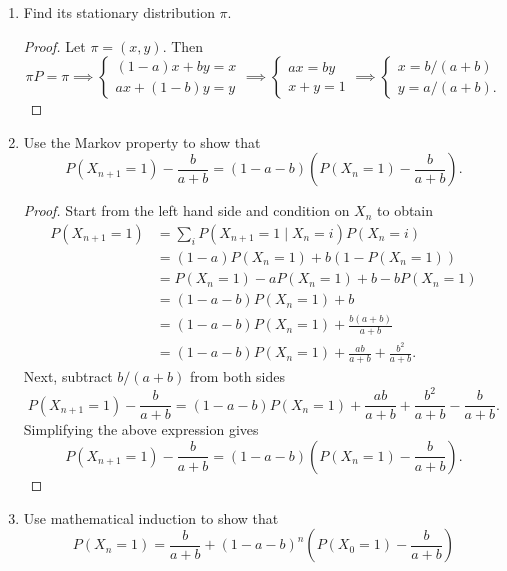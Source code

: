 \documentclass[oneside,reqno]{amsart}
\theoremstyle{definition}
\begin{document}
\begin{enumerate}
\item
Find its stationary distribution $\pi$. 
\begin{proof}
Let $\pi = (x,y)$. Then 
\[
	\pi P = \pi 
	\implies 
	\begin{cases}
		(1-a)x + by = x \\
		a x + (1-b)y = y
	\end{cases}
	\implies 
	\begin{cases}
		ax = by \\
		x+y = 1
	\end{cases}
	\implies 
	\begin{cases}
		x = b/(a+b) \\
		y = a/(a+b).
	\end{cases}
\]
\end{proof}

\item
Use the Markov property to show that 
\[
	P(X_{n+1} = 1) - \frac{b}{a+b} = (1-a-b)\left( P(X_n = 1)- \frac{b}{a+b}\right).
\]

\begin{proof}
Start from the left hand side and condition on $X_n$ to obtain 
\begin{align*}
	P(X_{n+1} = 1) &= \sum_i  P(X_{n+1} = 1 \mid X_n = i) P(X_n = i) \\
						    &= (1-a) P(X_n=1) + b(1-P(X_n=1)) \\
						    &= P(X_n = 1) - aP(X_n=1) + b - bP(X_n=1) \\
						    &= (1-a-b)P(X_n=1) + b \\
						    &= (1-a-b)P(X_n=1) + \frac{b(a+b)}{a+b} \\
						    &= (1-a-b)P(X_n=1) + \frac{ab}{a+b} + \frac{b^2}{a+b}.
\end{align*}
Next, subtract $b/(a+b)$ from both sides 
\[
	P(X_{n+1} = 1) -\frac{b}{a+b} = (1-a-b)P(X_n=1) + \frac{ab}{a+b} + \frac{b^2}{a+b} - \frac{b}{a+b}.
\]
Simplifying the above expression gives
\[
	P(X_{n+1} = 1) - \frac{b}{a+b} = (1-a-b)\left( P(X_n = 1)- \frac{b}{a+b}\right).
\]
\end{proof}

\item
Use mathematical induction to show that 
\[
	P(X_n = 1) = \frac{b}{a+b} + (1-a-b)^n \left( P(X_0 = 1)- \frac{b}{a+b}\right)
\]


\end{enumerate}
\end{document}
